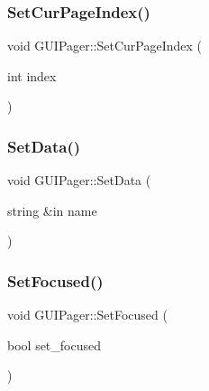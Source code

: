 \hypertarget{class_g_u_i_pager_afe7f75b394d515a2b4f587c3fc9cd6d1}{}\label{class_g_u_i_pager_afe7f75b394d515a2b4f587c3fc9cd6d1} 
\subsubsection{\texorpdfstring{Set\+Cur\+Page\+Index()}{SetCurPageIndex()}}
{\footnotesize\ttfamily void G\+U\+I\+Pager\+::\+Set\+Cur\+Page\+Index (\begin{DoxyParamCaption}\item[{int}]{index }\end{DoxyParamCaption})}

\hypertarget{class_g_u_i_pager_af6cc0b00d4bf521192142c01626b7f90}{}\label{class_g_u_i_pager_af6cc0b00d4bf521192142c01626b7f90} 
\subsubsection{\texorpdfstring{Set\+Data()}{SetData()}}
{\footnotesize\ttfamily void G\+U\+I\+Pager\+::\+Set\+Data (\begin{DoxyParamCaption}\item[{string \&in}]{name }\end{DoxyParamCaption})}

\hypertarget{class_g_u_i_pager_ad3868d8176faa9682b6a0ed27e63bdfe}{}\label{class_g_u_i_pager_ad3868d8176faa9682b6a0ed27e63bdfe} 
\subsubsection{\texorpdfstring{Set\+Focused()}{SetFocused()}}
{\footnotesize\ttfamily void G\+U\+I\+Pager\+::\+Set\+Focused (\begin{DoxyParamCaption}\item[{bool}]{set\+\_\+focused }\end{DoxyParamCaption})}

\hypertarget{class_g_u_i_pager_a7b54fed44f099b0e133e410ab7f56ff5}{}\label{class_g_u_i_pager_a7b54fed44f099b0e133e410ab7f56ff5} 
